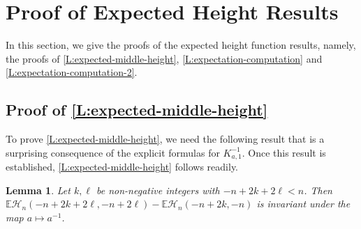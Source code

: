 \documentclass[11pt,twoside]{amsart}
\theoremstyle{plain}
\newtheorem{lem}[thm]{Lemma}
\numberwithin{quest}{section}
\theoremstyle{remark}
\numberwithin{rem}{section}
\theoremstyle{definition}
\begin{document}
	
	
	\section{Proof of Expected Height Results}
    \label{S:sec10}
	In this section, we give the proofs  of the expected height function results, namely, the proofs of \cref{L:expected-middle-height}, \cref{L:expectation-computation} and \cref{L:expectation-computation-2}. 
	
	\subsection{Proof of \cref{L:expected-middle-height}} \label{S:Proof:expected-middle-height}
	
	To prove \cref{L:expected-middle-height}, we need the following result that is a surprising consequence of the explicit formulas for $K^{-1}_{a,1}$.  Once this result is established, \cref{L:expected-middle-height} follows readily. 
	
	\begin{lem} \label{L:expected-height-invariant}
		Let $k,\ell$ be {non-negative} integers with $-n+2k+2\ell<n$. Then $\mathbb{E}\mathcal{H}_n(-n+2k+2\ell,-n+2\ell)-\mathbb{E}\mathcal{H}_n(-n+2k,-n)$ is invariant under the map $a \mapsto a^{-1}$. 
	\end{lem}
    
\end{document}
